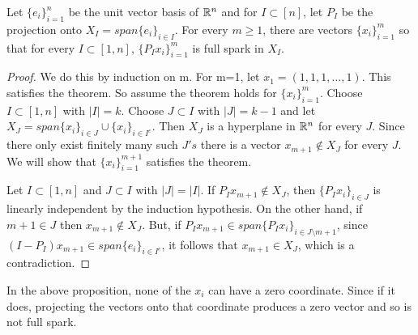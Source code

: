 \begin{proposition}\label{P3}
Let $\{e_i\}_{i=1}^n$ be the unit vector basis of $\mathbb R^n$ and for $I\subset [n]$, let $P_I$ be
the projection onto $X_I=span\{e_i\}_{i\in I}$.
 For every $m\ge 1$, there are vectors $\{x_i\}_{i=1}^m$ so
that for every $I\subset [1,n]$, $\{P_Ix_i\}_{i=1}^m$ is full spark in $X_I$.
\end{proposition}

\begin{proof}
We do this by induction on m. For m=1, let $x_1=(1,1,1,\ldots,1)$. This satisfies the theorem. So assume
the theorem holds for $\{x_i\}_{i=1}^m$. Choose $I\subset [1,n]$ with $|I|=k$. Choose $J\subset I$ with
$|J|=k-1$ and let $X_J=span\{x_i\}_{i\in J}\cup \{x_i\}_{i\in I^c}$. Then $X_J$ is a hyperplane in $\mathbb R^n$ for
every $J$. Since there only exist finitely many such $J's$ there is a vector $x_{m+1}\notin X_J$ for every $J$.
We will show that $\{x_i\}_{i=1}^{m+1}$ satisfies the theorem.

Let $I\subset [1,n]$ and $J\subset I$ with $|J|=|I|$. If $P_Ix_{m+1} \notin X_J$, then $\{P_Ix_i\}_{i\in J}$ is linearly
independent by the induction hypothesis. On the other hand, if $m+1\in J$ then $x_{m+1}\notin X_J$. But,
if $P_Ix_{m+1}\in span \{P_Ix_i\}_{i\in J\setminus m+1}$, since $(I-P_I)x_{m+1}\in span \{e_i\}_{i\in I^c}$, it follows
that $x_{m+1}\in X_J$, which is a contradiction.
\end{proof}
\begin{remark}
In the above proposition, none of the $x_i$ can have a zero coordinate. Since if it does, projecting the vectors
onto that coordinate produces a zero vector and so is not full spark.
\end{remark}





